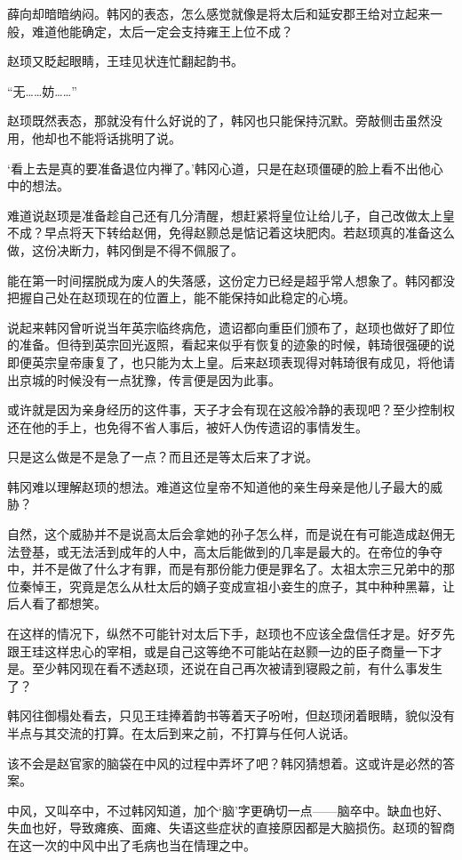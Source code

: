 薛向却暗暗纳闷。韩冈的表态，怎么感觉就像是将太后和延安郡王给对立起来一般，难道他能确定，太后一定会支持雍王上位不成？

赵顼又眨起眼睛，王珪见状连忙翻起韵书。

“无……妨……”

赵顼既然表态，那就没有什么好说的了，韩冈也只能保持沉默。旁敲侧击虽然没用，他却也不能将话挑明了说。

‘看上去是真的要准备退位内禅了。’韩冈心道，只是在赵顼僵硬的脸上看不出他心中的想法。

难道说赵顼是准备趁自己还有几分清醒，想赶紧将皇位让给儿子，自己改做太上皇不成？早点将天下转给赵佣，免得赵颢总是惦记着这块肥肉。若赵顼真的准备这么做，这份决断力，韩冈倒是不得不佩服了。

能在第一时间摆脱成为废人的失落感，这份定力已经是超乎常人想象了。韩冈都没把握自己处在赵顼现在的位置上，能不能保持如此稳定的心境。

说起来韩冈曾听说当年英宗临终病危，遗诏都向重臣们颁布了，赵顼也做好了即位的准备。但待到英宗回光返照，看起来似乎有恢复的迹象的时候，韩琦很强硬的说即便英宗皇帝康复了，也只能为太上皇。后来赵顼表现得对韩琦很有成见，将他请出京城的时候没有一点犹豫，传言便是因为此事。

或许就是因为亲身经历的这件事，天子才会有现在这般冷静的表现吧？至少控制权还在他的手上，也免得不省人事后，被奸人伪传遗诏的事情发生。

只是这么做是不是急了一点？而且还是等太后来了才说。

韩冈难以理解赵顼的想法。难道这位皇帝不知道他的亲生母亲是他儿子最大的威胁？

自然，这个威胁并不是说高太后会拿她的孙子怎么样，而是说在有可能造成赵佣无法登基，或无法活到成年的人中，高太后能做到的几率是最大的。在帝位的争夺中，并不是做了什么才有罪，而是有那份能力便是罪名了。太祖太宗三兄弟中的那位秦悼王，究竟是怎么从杜太后的嫡子变成宣祖小妾生的庶子，其中种种黑幕，让后人看了都想笑。

在这样的情况下，纵然不可能针对太后下手，赵顼也不应该全盘信任才是。好歹先跟王珪这样忠心的宰相，或是自己这等绝不可能站在赵颢一边的臣子商量一下才是。至少韩冈现在看不透赵顼，还说在自己再次被请到寝殿之前，有什么事发生了？

韩冈往御榻处看去，只见王珪捧着韵书等着天子吩咐，但赵顼闭着眼睛，貌似没有半点与其交流的打算。在太后到来之前，不打算与任何人说话。

该不会是赵官家的脑袋在中风的过程中弄坏了吧？韩冈猜想着。这或许是必然的答案。

中风，又叫卒中，不过韩冈知道，加个‘脑’字更确切一点——脑卒中。缺血也好、失血也好，导致瘫痪、面瘫、失语这些症状的直接原因都是大脑损伤。赵顼的智商在这一次的中风中出了毛病也当在情理之中。

